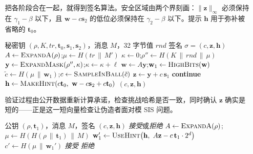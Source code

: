 把各阶段合在一起，就得到签名算法。安全区域由两个界刻画：$\|\mathbf{z}\|_\infty$ 必须保持在 $\gamma_1-\beta$ 以下，且 $\mathbf{w}-c\mathbf{s}_2$ 的低位必须保持在 $\gamma_2-\beta$ 以下。提示 $\mathbf{h}$ 用于弥补被省略的 $\mathbf{t}_0$。

\begin{algorithm}[H]
\caption{ML-DSA.Sign（教学形式）}
\label{alg:mldsa-sign}
\begin{algorithmic}[1]
\Require 秘密钥 $(\rho,K,tr,\mathbf{t}_0,\mathbf{s}_1,\mathbf{s}_2)$，消息 $M$，32 字节值 $rnd$
\Ensure 签名 $\sigma=(c,\mathbf{z},\mathbf{h})$
\State $A \gets \textsc{ExpandA}(\rho)$;\quad $\mu \gets H(tr\,\|\,M')$
\State $\kappa \gets 0$;\quad $\rho'' \gets H(K\,\|\,rnd\,\|\,\mu)$ 
\Loop
  \State $\mathbf{y} \gets \textsc{ExpandMask}(\rho'', \kappa)$;\quad $\kappa \gets \kappa+\ell$ 
  \State $\mathbf{w} \gets A\mathbf{y}$;\quad $\mathbf{w}_1 \gets \textsc{HighBits}(\mathbf{w})$
  \State $\tilde c \gets H(\mu\,\|\,\mathbf{w}_1)$;\quad $c\gets\textsc{SampleInBall}(\tilde c)$
  \State $\mathbf{z} \gets \mathbf{y} + c\,\mathbf{s}_1$
    \State \textbf{continue} 
  \EndIf
  \State $\mathbf{h} \gets \textsc{MakeHint}(c\mathbf{t}_0,\ \mathbf{w}-c\mathbf{s}_2+c\mathbf{t}_0)$
  \State \Return $(c,\mathbf{z},\mathbf{h})$
\EndLoop
\end{algorithmic}
\end{algorithm}

验证过程由公开数据重新计算承诺，检查挑战哈希是否一致，同时确认 $\mathbf{z}$ 确实是短的——正是这一短向量检查让伪造者面对模 SIS 问题。

\begin{algorithm}[H]
\caption{ML-DSA.Verify（教学形式）}
\label{alg:mldsa-verify}
\begin{algorithmic}[1]
\Require 公钥 $(\rho,\mathbf{t}_1)$，消息 $M$，签名 $(c,\mathbf{z},\mathbf{h})$
\Ensure \emph{接受}或\emph{拒绝}
\State $A \gets \textsc{ExpandA}(\rho)$;\quad $\mu \gets H(H(\rho\,\|\,\mathbf{t}_1)\,\|\,M)$
\State $\mathbf{w}_1' \gets \textsc{UseHint}\big(\mathbf{h},\ A\mathbf{z} - c\,\mathbf{t}_1\cdot 2^d\big)$
\State $c' \gets H(\mu\,\|\,\mathbf{w}_1')$
  \State \Return \emph{接受}
\Else
  \State \Return \emph{拒绝}
\EndIf
\end{algorithmic}
\end{algorithm}

